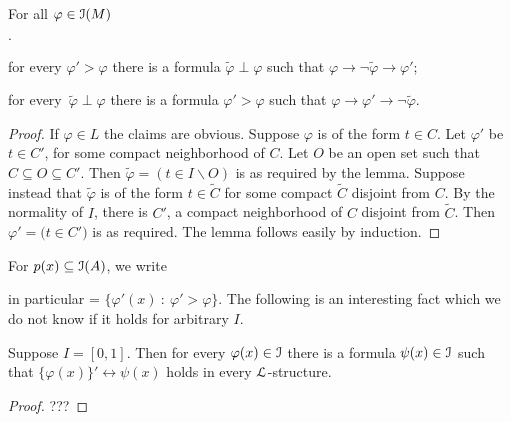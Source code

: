 \documentclass[10pt,oneside]{amsproc}
\newcommand{\mylabel}[1]{{#1}\hfill}
\renewenvironment{itemize}
  {\begin{list}{$\cdot$}{%
  \setlength{\parskip}{0mm}
  \setlength{\topsep}{.4\baselineskip}
  \setlength{\rightmargin}{0mm}
  \setlength{\listparindent}{0mm}
  \setlength{\itemindent}{0mm}
  \setlength{\labelwidth}{3ex}
  \setlength{\itemsep}{.2\baselineskip}
  \setlength{\parsep}{.2\baselineskip}
  \setlength{\partopsep}{0mm}
  \setlength{\labelsep}{1ex}
  \setlength{\leftmargin}{\labelwidth+\labelsep}
  \let\makelabel\mylabel}}{%
\end{list}}
\renewcommand*{\emph}[1]{%
   \smash{\tikz[baseline]\node[rectangle, fill=teal!25, rounded corners, inner xsep=0.5ex, inner ysep=0.2ex, anchor=base, minimum height = 2.7ex]{\strut #1};}}
\begin{document}
\begin{lemma}\label{lem_interpolation}
  For all  $\varphi\in{\EuScript I}(M)$
  \begin{itemize}
    \item[1.]for every $\varphi'>\varphi$ there is a formula $\tilde{\varphi}\perp\varphi$ such that $\varphi\rightarrow\neg \tilde{\varphi}\rightarrow\varphi'$;
    \item[2.] for every\, $\tilde{\varphi}\perp\varphi$ there is a formula $\varphi'>\varphi$ such that  $\varphi\rightarrow\varphi'\rightarrow\neg \tilde{\varphi}$.
  \end{itemize}
\end{lemma}

\begin{proof}
  If $\varphi\in L$ the claims are obvious.
  Suppose $\varphi$ is of the form $t\in C$.
  Let $\varphi'$ be $t\in C'$, for some compact neighborhood of $C$.
  Let $O$ be an open set such that $C\subseteq O\subseteq C'$.
  Then $\tilde{\varphi}=(t\in I\smallsetminus O)$ is as required by the lemma.
  Suppose instead that $\tilde{\varphi}$ is of the form $t\in\tilde{C}$ for some compact $\tilde{C}$ disjoint from $C$.
  By the normality of $I$, there is  $C'$, a compact neighborhood of $C$ disjoint from $\tilde{C}$.
  Then  $\varphi'=\big(t\in C'\big)$ is as required.
  The lemma follows easily by induction.
\end{proof}

For $p(x)\subseteq{\EuScript I}(A)$, we write 

\ceq{\hfill \emph{$p'(x)$}}{=}{\big\{\varphi'(x)\ :\ \varphi'>\varphi\textrm{ for some }\varphi(x)\in p\big\}}

in particular  \emph{$\{\varphi(x)\}'$} = $\big\{\varphi'(x)\ :\ \varphi'>\varphi\big\}$.
The following is an interesting fact which we do not know if it holds for arbitrary $I$. 

\begin{proposition}
  Suppose $I=[0,1]$.
  Then for every $\varphi(x)\in{\EuScript I}$ there is a formula $\psi(x)\in{\EuScript I}$ such that $\{\varphi(x)\}'\leftrightarrow\psi(x)$ holds in every ${\EuScript L}$-structure. 
\end{proposition}

\begin{proof}
  ???
\end{proof}




\end{document}
